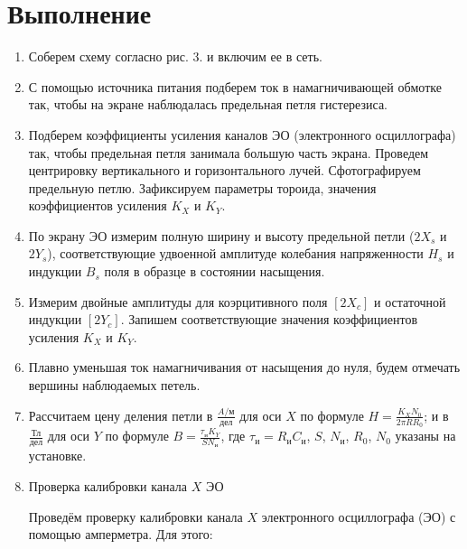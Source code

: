 \documentclass[a4paper]{article}
\begin{document}
\section{Выполнение}
\begin{enumerate}

\subsection{Алгоритм действий.}
\item Соберем схему согласно рис. 3. и включим ее в сеть.

\item С помощью источника питания подберем ток в намагничивающей обмотке так, чтобы на экране наблюдалась предельная петля гистерезиса. 

\item Подберем коэффициенты усиления каналов ЭО (электронного осциллографа) так, чтобы предельная петля занимала большую часть экрана. Проведем центрировку вертикального и горизонтального лучей. Сфотографируем предельную петлю. Зафиксируем параметры тороида, значения коэффициентов усиления $K_X$ и $K_Y$.

\item По экрану ЭО измерим полную ширину и высоту предельной петли ($2X_s$ и $2Y_s$), соответствующие удвоенной амплитуде колебания напряженности $H_s$ и индукции $B_s$ поля в образце в состоянии насыщения.

\item Измерим двойные амплитуды для коэрцитивного поля $[2X_c]$ и остаточной индукции $[2Y_c]$. Запишем соответствующие значения коэффициентов усиления $K_X$ и $K_Y$.

\item Плавно уменьшая ток намагничивания от насыщения до нуля, будем отмечать вершины наблюдаемых петель.

\item Рассчитаем цену деления петли в $\frac{A/\text{м}}{\text{дел}}$ для оси $X$ по формуле $H = \frac{K_X N_0}{2\pi R R_0}$; и в $\frac{\text{Тл}}{\text{дел}}$ для оси $Y$ по формуле $B = \frac{\tau_{\text{и}}K_Y}{S N_{\text{и}}}$, где $\tau_{\text{и}} = R_{\text{и}}C_{\text{и}}$, $S$, $N_{\text{и}}$, $R_0$, $N_0$ указаны на установке.

\item Проверка калибровки канала $X$ ЭО

Проведём проверку калибровки канала $X$ электронного осциллографа (ЭО) с помощью амперметра. Для этого:


\end{enumerate}
\end{document}
